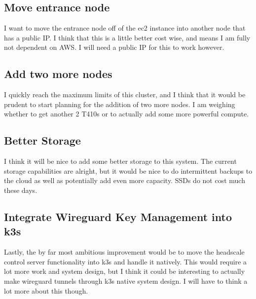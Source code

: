 \documentclass[12pt]{article}
\begin{document}
\subsection{Move entrance node}
I want to move the entrance node off of the ec2 instance into another node that has a public IP. I think that this is a little better cost wise, and means I am fully not dependent on AWS. I will need a public IP for this to work however.

\subsection{Add two more nodes}
I quickly reach the maximum limits of this cluster, and I think that it would be prudent to start planning for the addition of two more nodes. I am weighing whether to get another 2 T410s or to actually add some more powerful compute.

\subsection{Better Storage}
I think it will be nice to add some better storage to this system. The current storage capabilities are alright, but it would be nice to do intermittent backups to the cloud as well as potentially add even more capacity. SSDs do not cost much these days.

\subsection{Integrate Wireguard Key Management into k3s}
Lastly, the by far most ambitious improvement would be to move the headscale control server functionality into k3s and handle it natively. This would require a lot more work and system design, but I think it could be interesting to actually make wireguard tunnels through k3s native system design. I will have to think a lot more about this though.
\end{document}
